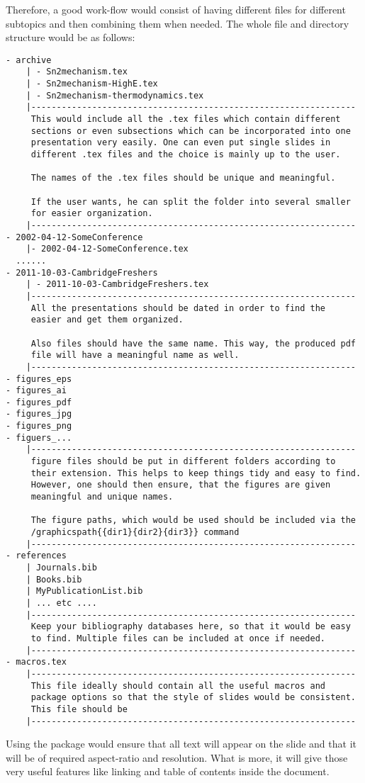 \documentclass[
]{scrartcl}
\begin{document}
%
Therefore, a good work-flow would consist of having different  files
    for different subtopics and then combining them when needed.
%
The whole file and directory structure would be as follows:
\begin{lstlisting}
- archive
    | - Sn2mechanism.tex
    | - Sn2mechanism-HighE.tex
    | - Sn2mechanism-thermodynamics.tex
    |----------------------------------------------------------------
     This would include all the .tex files which contain different
     sections or even subsections which can be incorporated into one
     presentation very easily. One can even put single slides in
     different .tex files and the choice is mainly up to the user.

     The names of the .tex files should be unique and meaningful.

     If the user wants, he can split the folder into several smaller 
     for easier organization.
    |----------------------------------------------------------------
- 2002-04-12-SomeConference
    |- 2002-04-12-SomeConference.tex
  ......
- 2011-10-03-CambridgeFreshers
    | - 2011-10-03-CambridgeFreshers.tex
    |----------------------------------------------------------------
     All the presentations should be dated in order to find the
     easier and get them organized.
    
     Also files should have the same name. This way, the produced pdf
     file will have a meaningful name as well.
    |----------------------------------------------------------------
- figures_eps
- figures_ai
- figures_pdf
- figures_jpg
- figures_png
- figuers_...
    |----------------------------------------------------------------
     figure files should be put in different folders according to
     their extension. This helps to keep things tidy and easy to find.
     However, one should then ensure, that the figures are given
     meaningful and unique names.
    
     The figure paths, which would be used should be included via the
     /graphicspath{{dir1}{dir2}{dir3}} command
    |----------------------------------------------------------------
- references
    | Journals.bib
    | Books.bib
    | MyPublicationList.bib
    | ... etc ....
    |----------------------------------------------------------------
     Keep your bibliography databases here, so that it would be easy
     to find. Multiple files can be included at once if needed.
    |----------------------------------------------------------------
- macros.tex
    |----------------------------------------------------------------
     This file ideally should contain all the useful macros and
     package options so that the style of slides would be consistent.
     This file should be 
    |----------------------------------------------------------------
\end{lstlisting}
%
Using the  package would ensure that all text will appear on the
    slide and that it will be of required aspect-ratio and resolution.
%
What is more, it will give those very useful features like linking and table of
    contents inside the document.
%




\end{document}
